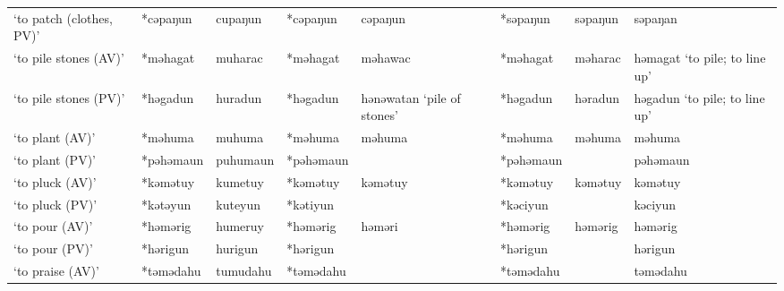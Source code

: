 \begin{landscape}
\begin{longtable}[c]{@{}p{3cm}<{\raggedright}p{2.75cm}<{\raggedright}p{2.75cm}<{\raggedright}p{2.75cm}<{\raggedright}p{2.75cm}<{\raggedright}p{2.75cm}<{\raggedright}p{2.75cm}<{\raggedright}p{2.75cm}<{\raggedright}@{}}
`to patch (clothes, PV)'                             & *cəpaŋun     & cupaŋun                       & *cəpaŋun       & cəpaŋun                    & *səpaŋun         & səpaŋun                  & səpaŋan                           \\
`to pile stones (AV)'                                & *məhagat     & muharac                       & *məhagat       & məhawac                    & *məhagat         & məharac                  & həmagat `to pile; to line up'     \\
`to pile stones (PV)'                                & *həgadun     & huradun                       & *həgadun       & hənəwatan `pile of stones' & *həgadun         & həradun                  & həgadun `to pile; to line up'     \\
`to plant (AV)'                                      & *məhuma      & muhuma                        & *məhuma        & məhuma                     & *məhuma          & məhuma                   & məhuma                            \\
`to plant (PV)'                                      & *pəhəmaun    & puhumaun                      & *pəhəmaun      &                            & *pəhəmaun        &                          & pəhəmaun                          \\
`to pluck (AV)'                                      & *kəmətuy     & kumetuy                       & *kəmətuy       & kəmətuy                    & *kəmətuy         & kəmətuy                  & kəmətuy                           \\
`to pluck (PV)'                                      & *kətəyun     & kuteyun                       & *kətiyun       &                            & *kəciyun         &                          & kəciyun                           \\
`to pour (AV)'                                       & *həmərig     & humeruy                       & *həmərig       & həməri                     & *həmərig         & həmərig                  & həmərig                           \\
`to pour (PV)'                                       & *hərigun     & hurigun                       & *hərigun       &                            & *hərigun         &                          & hərigun                           \\
`to praise (AV)'                                     & *təmədahu    & tumudahu                      & *təmədahu      &                            & *təmədahu        &                          & təmədahu                          \\

\end{longtable}
\end{landscape}
